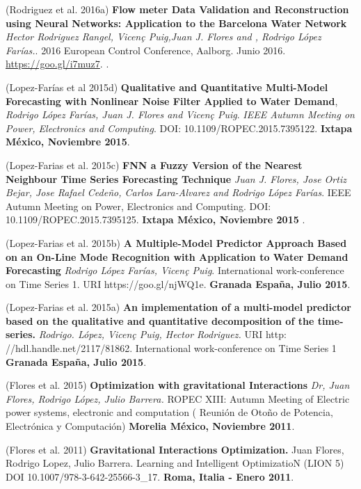 \begin{innerlist}
\item  (Rodriguez et al. 2016a)  \textbf{Flow meter Data Validation and Reconstruction using Neural Networks: Application to the Barcelona Water Network} \textit{Hector Rodriguez Rangel, Vicen\c{c} Puig,Juan J. Flores and ,  Rodrigo López Farías.}. 2016 European Control Conference, Aalborg. Junio 2016. \url{https://goo.gl/i7muz7}. .

\item  (Lopez-Farías et al 2015d) \textbf{Qualitative and Quantitative Multi-Model Forecasting with Nonlinear Noise Filter Applied to Water Demand}, \textit{Rodrigo López Farías, Juan J. Flores and Vicen\c{c} Puig}.   \textit{IEEE Autumn Meeting on Power, Electronics and Computing}. DOI: 10.1109/ROPEC.2015.7395122.  \textbf{Ixtapa México, Noviembre 2015}.

\item  (Lopez-Farias et al. 2015c) \textbf{FNN a Fuzzy Version of the Nearest Neighbour Time Series Forecasting Technique } \textit{Juan J. Flores, Jose Ortiz Bejar, Jose Rafael Cedeño, Carlos Lara-Alvarez and Rodrigo López Farías}. {IEEE Autumn Meeting on Power, Electronics and Computing}. DOI: 10.1109/ROPEC.2015.7395125. \textbf{Ixtapa México, Noviembre 2015 }.

\item  (Lopez-Farias et al. 2015b)  \textbf{A Multiple-Model Predictor Approach Based on an On-Line Mode Recognition with Application to Water Demand Forecasting} \textit{Rodrigo López Farías, Vicen\c{c} Puig}.  {International work-conference on Time Series 1. 
} URI https://goo.gl/njWQ1e. \textbf{Granada España, Julio 2015}.

\item  (Lopez-Farias et al. 2015a) \textbf{An implementation of a multi-model predictor based on the qualitative and quantitative decomposition of the time-series.} \textit{Rodrigo. López, Vicen\c{c} Puig, Hector Rodriguez.} URI http: //hdl.handle.net/2117/81862. {International work-conference on Time Series 1 
} \textbf{Granada España, Julio 2015}.

\item (Flores et al. 2015) \textbf{Optimization with gravitational Interactions} \textit{Dr, Juan Flores, Rodrigo López, Julio Barrera.}   {ROPEC XIII: Autumn Meeting of Electric power systems, electronic and computation ( Reunión de Oto\~no de Potencia, Electrónica y Computación)} \textbf{ Morelia México, Noviembre 2011}.

\item (Flores et al. 2011) \textbf{Gravitational Interactions Optimization.} Juan Flores, Rodrigo Lopez, Julio Barrera. {Learning and Intelligent OptimizatioN}  (LION 5) DOI 10.1007/978-3-642-25566-3\_17. \textbf{Roma, Italia - Enero 2011}. 


\end{innerlist}
